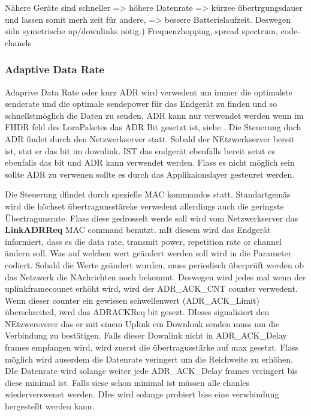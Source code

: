 \documentclass[a4paper,12pt]{article}
\begin{document}
            Nähere Geräte sind schneller => höhere Datenrate => kürzee übertrgungsdauer und lassen somit merh zeit für andere, => bessere Batterielaufzeit. Deswegen sidn symetrische up/downlinks nötig.)
            Frequenzhopping, spread spectrum, code-chanels
            \subsubsection{Adaptive Data Rate}\label{sec:ADR}
                Adaprive Data Rate oder kurz ADR wird verwedent um immer die optimalste senderate und die optimale sendepower für das Endgerät zu finden und so schnellstmöglich die Daten zu senden. ADR kann nur verwendet werden wenn im FHDR feld des LoraPaketes das ADR Bit gesetzt ist, siehe .
                Die Steuerung duch ADR findet durch den Netzwerkserver statt. Sobald der NEtzwerkserver bereit ist, stzt er das bit im downlink. IST das endgerät ebenfalls bereit setzt es ebenfalls das bit und ADR kann verwendet werden. Flass es nicht möglich sein sollte ADR zu verwenen  sollte es durch das Applikaionslayer gesteuret werden.

                Die Steuerung dfindet durch spezielle MAC kommandos statt. Standartgemäs wird die höchset übertragunsstäreke verwedent allerdings auch die geringste Übertragunsrate. Flass diese gedrosselt werde soll wird vom Netzwerkserver das \textbf{LinkADRReq} MAC command benutzt. mIt diesem wird das Endgerät informiert, dass es die data rate, transmit power, 
                repetition rate or channel ändern soll. Was auf welchen wert geändert werden soll wird in die Parameter codiert. Sobald die Werte geändert wurden, muss periodisch überprüft werden ob das Netzwerk die NAchrichten noch bekommt. Deswegen wird jedes mal wenn der uplinkframecounet  erhöht wird, wird der ADR\_ACK\_CNT counter verwedent.
                Wenn dieser counter ein gewissen schwellenwert (ADR\_ACK\_Limit) überschreited, iwrd das ADRACKReq bit gesezt. DIeses signalisiert den NEtzwersverer das er mit einem Uplink ein Downlonk senden muss um die Verbindung zu bestätigen. Falls dieser Downlink nicht in ADR\_ACK\_Delay frames empfangen wird, wird zuerst die übertragusstärke auf max gesetzt. Flass möglich wird auserdem die Datenrate veringert um die Reichweite zu erhöhen. DIe 
                Datenrate wird solange weiter jede ADR\_ACK\_Delay frames veringert bis diese minimal ist. Falls siese schon minimal ist müssen alle chanles wiederverswenet werden. DIes wird solange probiert biss eine verwbindung hergestellt werden kann.
                
\end{document}
